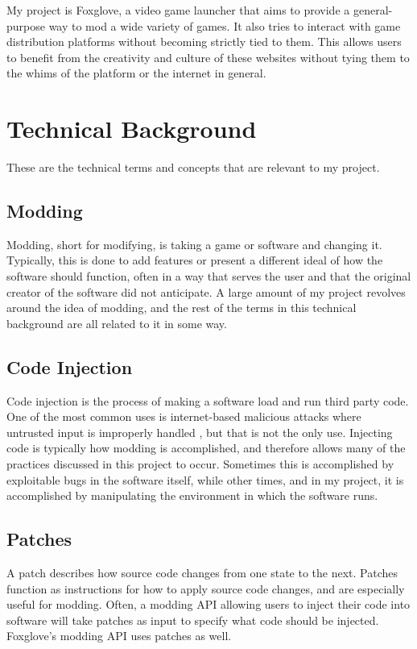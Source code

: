 \documentclass[10pt,twocolumn]{article}
\begin{document}
My project is Foxglove, a video game launcher that aims to provide a
general-purpose way to mod a wide variety of games. It also tries to interact
with game distribution platforms without becoming strictly tied to them. This
allows users to benefit from the creativity and culture of these websites
without tying them to the whims of the platform or the internet in general.

\section{Technical Background}

These are the technical terms and concepts that are relevant to my project.

\subsection{Modding}

Modding, short for modifying, is taking a game or software and changing it.
Typically, this is done to add features or present a different ideal of how the
software should function, often in a way that serves the user and that the
original creator of the software did not anticipate. A large amount of my
project revolves around the idea of modding, and the rest of the terms in this
technical background are all related to it in some way.

\subsection{Code Injection}

Code injection is the process of making a software load and run third party
code. One of the most common uses is internet-based malicious attacks
where untrusted input is improperly handled
\cite{ray_defining_2012}, but that is not the only use.
Injecting code is typically how modding is accomplished, and therefore
allows many of the practices discussed in this project to occur. Sometimes this
is accomplished by exploitable bugs in the software itself, while other times,
and in my project, it is accomplished by manipulating the environment in which
the software runs.

\subsection{Patches}

A patch describes how source code changes from one state to the next. Patches
function as instructions for how to apply source code changes, and are
especially useful for modding. Often, a modding API allowing users to inject
their code into software will take patches as input to specify what code should
be injected. Foxglove's modding API uses patches as well.
\end{document}
